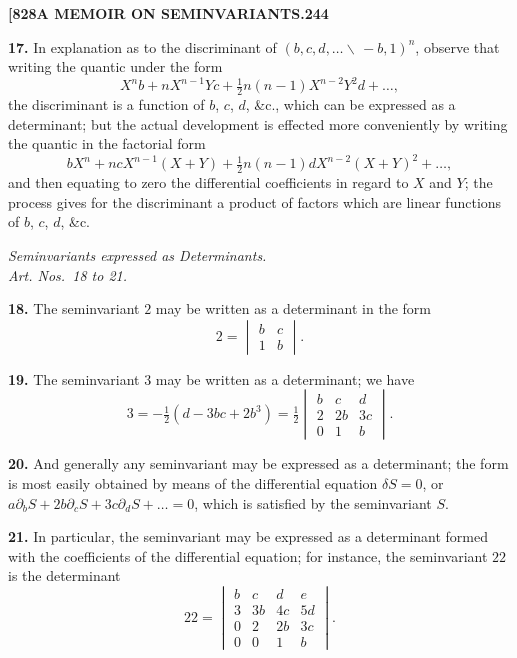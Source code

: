 \documentclass[11pt,a4paper]{book}
\begin{document}
\newpage
\setcounter{page}{244}

\noindent\textbf{[828}\hfill\textbf{A MEMOIR ON SEMINVARIANTS.}\hfill\textbf{244}

\bigskip

\noindent\textbf{17.} In explanation as to the discriminant of $(b, c, d, \dots \!\!\!\backslash\, -b, 1)^n$, observe that writing the quantic under the form
\[
X^n b + nX^{n-1}Y c + \tfrac{1}{2}n(n-1)X^{n-2}Y^2 d + \dots,
\]
the discriminant is a function of $b$, $c$, $d$, \&c., which can be expressed as a determinant; but the actual development is effected more conveniently by writing the quantic in the factorial form
\[
bX^n + ncX^{n-1}(X+Y) + \tfrac{1}{2}n(n-1)dX^{n-2}(X+Y)^2 + \dots,
\]
and then equating to zero the differential coefficients in regard to $X$ and $Y$; the process gives for the discriminant a product of factors which are linear functions of $b$, $c$, $d$, \&c.

\begin{center}
\textit{Seminvariants expressed as Determinants.}\\
\textit{Art. Nos.~18 to 21.}
\end{center}

\noindent\textbf{18.} The seminvariant $2$ may be written as a determinant in the form
\[
2 = \begin{vmatrix} b & c \\ 1 & b \end{vmatrix}.
\]

\noindent\textbf{19.} The seminvariant $3$ may be written as a determinant; we have
\[
3 = -\tfrac{1}{2}(d - 3bc + 2b^3) = \tfrac{1}{2}\begin{vmatrix} b & c & d \\ 2 & 2b & 3c \\ 0 & 1 & b \end{vmatrix}.
\]

\noindent\textbf{20.} And generally any seminvariant may be expressed as a determinant; the form is most easily obtained by means of the differential equation $\delta S = 0$, or $a\partial_b S + 2b\partial_c S + 3c\partial_d S + \dots = 0$, which is satisfied by the seminvariant $S$.

\noindent\textbf{21.} In particular, the seminvariant may be expressed as a determinant formed with the coefficients of the differential equation; for instance, the seminvariant $22$ is the determinant
\[
22 = \begin{vmatrix} b & c & d & e \\ 3 & 3b & 4c & 5d \\ 0 & 2 & 2b & 3c \\ 0 & 0 & 1 & b \end{vmatrix}.
\]
\end{document}
